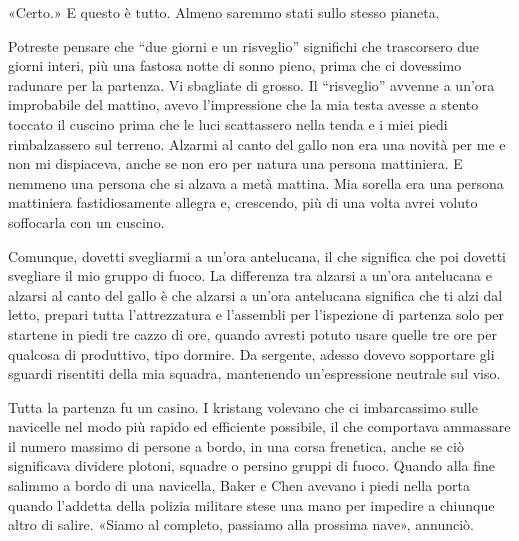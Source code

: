 «Certo.» E questo è tutto. Almeno saremmo stati sullo stesso pianeta.

Potreste pensare che ``due giorni e un risveglio'' significhi che
trascorsero due giorni interi, più una fastosa notte di sonno pieno,
prima che ci dovessimo radunare per la partenza. Vi sbagliate di grosso.
Il ``risveglio'' avvenne a un'ora improbabile del mattino, avevo
l'impressione che la mia testa avesse a stento toccato il cuscino prima
che le luci scattassero nella tenda e i miei piedi rimbalzassero sul
terreno. Alzarmi al canto del gallo non era una novità per me e non mi
dispiaceva, anche se non ero per natura una persona mattiniera. E
nemmeno una persona che si alzava a metà mattina. Mia sorella era una
persona mattiniera fastidiosamente allegra e, crescendo, più di una
volta avrei voluto soffocarla con un cuscino.

Comunque, dovetti svegliarmi a un'ora antelucana, il che significa che
poi dovetti svegliare il mio gruppo di fuoco. La differenza tra alzarsi
a un'ora antelucana e alzarsi al canto del gallo è che alzarsi a un'ora
antelucana significa che ti alzi dal letto, prepari tutta l'attrezzatura
e l'assembli per l'ispezione di partenza solo per startene in piedi tre
cazzo di ore, quando avresti potuto usare quelle tre ore per qualcosa di
produttivo, tipo dormire. Da sergente, adesso dovevo sopportare gli
sguardi risentiti della mia squadra, mantenendo un'espressione neutrale
sul viso.

Tutta la partenza fu un casino. I kristang volevano che ci imbarcassimo
sulle navicelle nel modo più rapido ed efficiente possibile, il che
comportava ammassare il numero massimo di persone a bordo, in una corsa
frenetica, anche se ciò significava dividere plotoni, squadre o persino
gruppi di fuoco. Quando alla fine salimmo a bordo di una navicella,
Baker e Chen avevano i piedi nella porta quando l'addetta della polizia
militare stese una mano per impedire a chiunque altro di salire. «Siamo
al completo, passiamo alla prossima nave», annunciò.

